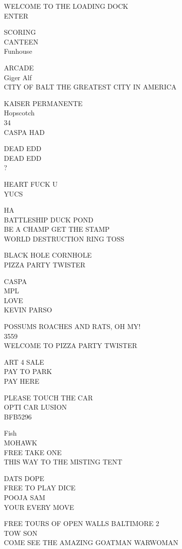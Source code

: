 \documentclass[10pt,letterpaper]{article}
\begin{document}
WELCOME TO THE LOADING DOCK\\
ENTER

SCORING\\
CANTEEN\\
Funhouse

ARCADE\\
Giger Alf\\
CITY OF BALT THE GREATEST CITY IN AMERICA

KAISER PERMANENTE\\
Hopscotch\\
34\\
CASPA HAD

DEAD EDD\\
DEAD EDD\\
?

HEART FUCK U\\
YUCS

HA\\
BATTLESHIP DUCK POND\\
BE A CHAMP GET THE STAMP\\
WORLD DESTRUCTION RING TOSS

BLACK HOLE CORNHOLE\\
PIZZA PARTY TWISTER

CASPA\\
MPL\\
LOVE\\
KEVIN PARSO

POSSUMS ROACHES AND RATS, OH MY!\\
3559\\
WELCOME TO PIZZA PARTY TWISTER

ART 4 SALE\\
PAY TO PARK\\
PAY HERE

PLEASE TOUCH THE CAR\\
OPTI CAR LUSION\\
BFB5296

Fish\\
MOHAWK\\
FREE TAKE ONE\\
THIS WAY TO THE MISTING TENT

DATS DOPE\\
FREE TO PLAY DICE\\
POOJA SAM\\
YOUR EVERY MOVE

FREE TOURS OF OPEN WALLS BALTIMORE 2\\
TOW SON\\
COME SEE THE AMAZING GOATMAN WARWOMAN
\end{document}
